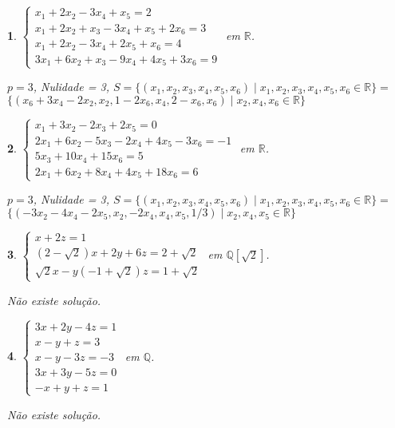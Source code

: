 \documentclass[12pt]{exam}
\newtheorem{exercicio}{}
\newcommand{\rac}{\mathbb{Q}}
\newcommand{\real}{\mathbb{R}}
\begin{document}
\begin{exercicio}
  $\begin{cases}
    x_1 + 2x_2 - 3x_4 + x_5 = 2\\
    x_1 + 2x_2 + x_3 - 3x_4 + x_5 + 2x_6 = 3\\
    x_1 + 2x_2 - 3x_4 + 2x_5 + x_6 = 4\\
    3x_1 + 6x_2 + x_3 - 9x_4 + 4x_5 + 3x_6 = 9
  \end{cases}$ em $\real$.
  \begin{solucao}
    $p = 3$, Nulidade = 3, $S = \{(x_1, x_2, x_3, x_4, x_5, x_6) \mid x_1, x_2, x_3, x_4, x_5, x_6 \in \real\} = $\\ $\{(x_6 + 3x_4 - 2x_2, x_2, 1 - 2x_6, x_4, 2 - x_6, x_6) \mid x_2, x_4, x_6 \in \real\}$
  \end{solucao}
\end{exercicio}

\begin{exercicio}
  $\begin{cases}
    x_1 + 3x_2 - 2x_3 + 2x_5 = 0\\
    2x_1 + 6x_2 - 5x_3 - 2x_4 + 4x_5 - 3x_6 = -1\\
    5x_3 + 10x_4 + 15x_6 = 5\\
    2x_1 + 6x_2 + 8x_4 + 4x_5 + 18x_6 = 6
  \end{cases}$ em $\real$.
  \begin{solucao}
    $p = 3$, Nulidade = 3, $S = \{(x_1, x_2, x_3, x_4, x_5, x_6) \mid x_1, x_2, x_3, x_4, x_5, x_6 \in \real\} = $\\ $\{(-3x_2 - 4x_4 - 2x_5, x_2, -2x_4, x_4, x_5, 1/3) \mid x_2, x_4, x_5 \in \real\}$
  \end{solucao}
\end{exercicio}

\begin{exercicio}
  $\begin{cases}
    x + 2z = 1\\
    (2 - \sqrt{2})x + 2y + 6z = 2 + \sqrt{2}\\
    \sqrt{2}x - y (-1 + \sqrt{2})z = 1 + \sqrt{2}
  \end{cases}$ em $\rac[\sqrt{2}]$.
  \begin{solucao}
    N\~ao existe solu\c{c}\~ao.
  \end{solucao}
\end{exercicio}


\begin{exercicio}\label{sistemalinearfim}
  $\begin{cases}
    3x + 2y - 4z = 1\\
    x - y + z = 3\\
    x - y - 3z = -3\\
    3x + 3y - 5z =0\\
    -x + y + z = 1
  \end{cases}$ em $\rac$.
\begin{solucao}
  N\~ao existe solu\c{c}\~ao.
\end{solucao}
\end{exercicio}
\end{document}
